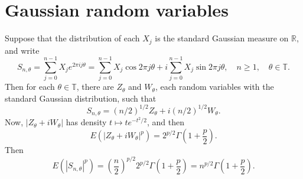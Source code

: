 \documentclass{amsart}
\begin{document}
\section{Gaussian random variables}
Suppose that the distribution of each $X_j$ is the standard Gaussian measure on $\mathbb{R}$, and write
\[
S_{n,\theta} = \sum_{j=0}^{n-1} X_j e^{2\pi ij\theta} = \sum_{j=0}^{n-1} X_j \cos 2\pi j \theta + i \sum_{j=0}^{n-1} X_j \sin 2\pi j\theta,
\quad n \geq 1, \quad \theta \in \mathbb{T}.
\]
Then for each $\theta \in \mathbb{T}$, there are $Z_\theta$ and $W_\theta$, each random variables with the standard Gaussian distribution,
such that
\[
S_{n,\theta} = (n/2)^{1/2} Z_\theta + i (n/2)^{1/2} W_\theta.
\]
Now, $|Z_\theta+iW_\theta|$ has density $t \mapsto t e^{-t^2/2}$, and then
\[
E(|Z_\theta+iW_\theta|^p) = 2^{p/2} \Gamma\left(1+\frac{p}{2}\right).
\]
Then
\[
E(|S_{n,\theta}|^p) = \left( \frac{n}{2} \right)^{p/2} 2^{p/2} \Gamma\left(1+\frac{p}{2}\right)
=n^{p/2} \Gamma\left(1+\frac{p}{2}\right).
\]




\end{document}
